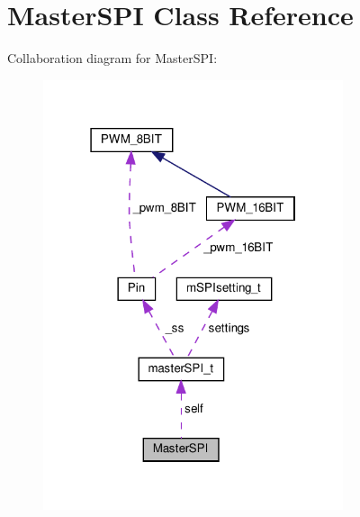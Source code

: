 \hypertarget{classMasterSPI}{}\section{Master\+S\+PI Class Reference}
\label{classMasterSPI}


Collaboration diagram for Master\+S\+PI\+:\nopagebreak
\begin{figure}[H]
\begin{center}
\leavevmode
\includegraphics[width=250pt]{classMasterSPI__coll__graph}
\end{center}
\end{figure}
